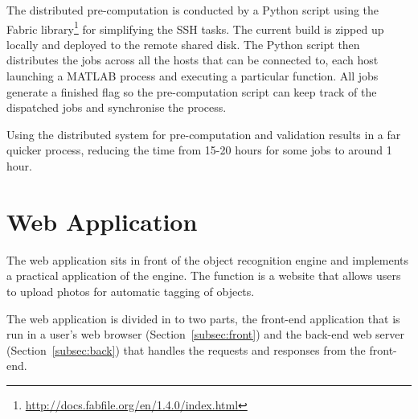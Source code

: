\documentclass[11pt, onecolumn, a4paper, final]{report} %
\begin{document}
The distributed pre-computation is conducted by a Python script using the Fabric library\footnote{\url{http://docs.fabfile.org/en/1.4.0/index.html}} for simplifying the SSH tasks. The current build is zipped up locally and deployed to the remote shared disk. The Python script then distributes the jobs across all the hosts that can be connected to, each host launching a MATLAB process and executing a particular function. All jobs generate a finished flag so the pre-computation script can keep track of the dispatched jobs and synchronise the process.

Using the distributed system for pre-computation and validation results in a far quicker process, reducing the time from 15-20 hours for some jobs to around 1 hour.

\section{Web Application}
\label{sec:webapp}
The web application sits in front of the object recognition engine and implements a practical application of the engine. The function is a website that allows users to upload photos for automatic tagging of objects.

The web application is divided in to two parts, the front-end application that is run in a user's web browser (Section~\ref{subsec:front}) and the back-end web server (Section~\ref{subsec:back}) that handles the requests and responses from the front-end.
\end{document}
